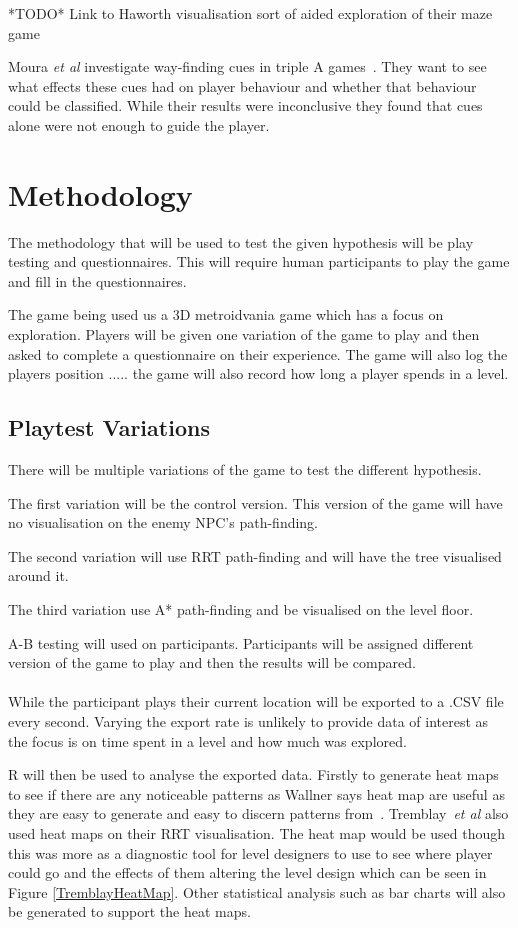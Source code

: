 \documentclass[journal]{IEEEtran}
\begin{document}
*TODO* Link to Haworth visualisation sort of aided exploration of their maze game


Moura \textit{et al} investigate way-finding cues in triple A games~\cite{moura2014}. They want to see what effects these cues had on player behaviour and whether that behaviour could be classified. While their results were inconclusive they found that cues alone were not enough to guide the player.  

\section{Methodology} %
The methodology that will be used to test the given hypothesis will be play testing and questionnaires. This will require human participants to play the game and fill in the questionnaires. 

The game being used us a 3D metroidvania game which has a focus on exploration. Players will be given one variation of the game to play and then asked to complete a questionnaire on their experience. The game will also log the players position .....
the game will also record how long a player spends in a level.  

\subsection{Playtest Variations}
There will be multiple variations of the game to test the different hypothesis. 

The first variation will be the control version. This version of the game will have no visualisation on the enemy NPC's path-finding.

The second variation will use RRT path-finding and will have the tree visualised around it. 

The third variation use A* path-finding and be visualised on the level floor. 

A-B testing will used on participants. Participants will be assigned different version of the game to play and then the results will be compared. \\
\\
While the participant plays their current location will be exported to a .CSV file every second. Varying the export rate is unlikely to provide data of interest as the focus is on time spent in a level and how much was explored. 

R will then be used to analyse the exported data. Firstly to generate heat maps to see if there are any noticeable patterns as Wallner says heat map are useful as they are easy to generate and easy to discern patterns from~\cite{Wallner2015}. Tremblay~\textit{et al} also used heat maps on their RRT visualisation. The heat map would be used though this was more as a diagnostic tool for level designers to use to see where player could go and the effects of them altering the level design which can be seen in Figure \ref{TremblayHeatMap}.
Other statistical analysis such as  bar charts will also be generated to support the heat maps.
 
\end{document}
